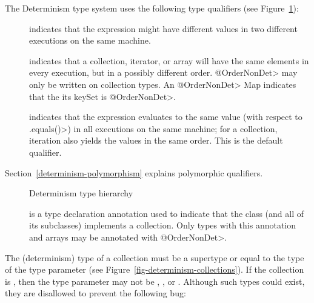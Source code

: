 
The Determinism type system uses the following type qualifiers (see Figure~\ref{fig-determinism-hierarchy}):
\begin{description}
\item[] indicates
  that the expression might have different values in two different executions on the same machine.
\item[] indicates that
  a collection, iterator, or array will have the same elements in every execution, but in a
  possibly different order.  \<@OrderNonDet> may only be written on
  collection types.
  An \<@OrderNonDet> Map indicates that the its keySet is \<@OrderNonDet>.
\item[] indicates that
  the expression evaluates to the same value (with respect to \<.equals()>) in all
  executions on the same machine; for a collection, iteration also yields the values in the same
  order.
  This is the default qualifier.
\end{description}

Section~\ref{determinism-polymorphism} explains polymorphic qualifiers.

\begin{figure}
  \begin{center}
  \end{center}
\caption{Determinism type hierarchy}
\label{fig-determinism-hierarchy}
\end{figure}


\begin{description}
\item[] is a type declaration annotation used
  to indicate that the class (and all of its subclasses) implements a collection. Only types with this
  annotation and arrays may be annotated with \<@OrderNonDet>.
\end{description}


The (determinism) type of a collection must be a supertype or equal to
the type of the type parameter (see Figure~\ref{fig-determinism-collections}).
If the collection is , then the type parameter may not be
, , or . Although such types could exist, they are
disallowed to prevent the following bug:

